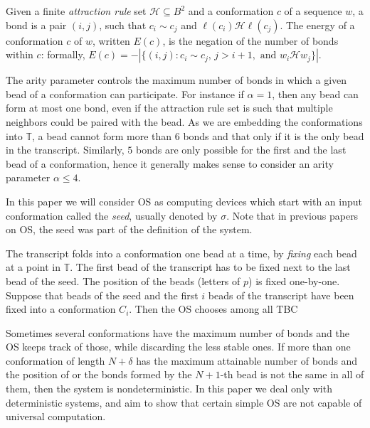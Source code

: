 \documentclass[]{llncs}
\newcommand{\red}{\color{red}}
\newcommand{\black}{\color{black}}
\newcommand{\bond}{\mathcal{H}}
\begin{document}
Given a finite \textit{attraction rule} set $\bond\subseteq B^2$ and a conformation $c$ of a sequence $w$, a bond is a pair $(i,j)$, such that $c_i\sim c_j$ and $\ell(c_i) \bond \ell(c_j)$. The energy of a conformation $c$ of $w$, written $E(c)$, is the negation of the number of bonds within $c$: formally, $E(c) = -|\{(i, j) : c_i \sim c_j \textrm{, } j > i + 1, \textrm{ and } w_i \bond w_j \}|$.

\bigskip



The arity parameter controls the maximum number of bonds in which a given bead of a conformation can participate. For instance if $\alpha=1$, then any bead can form at most one bond, even if the attraction rule set is such that multiple neighbors could be paired with the bead. As we are embedding the conformations into $\mathbb{T}$, a bead cannot form more than $6$ bonds and that only if it is the only bead in the transcript. Similarly, $5$ bonds are only possible for the first and the last bead of a conformation, hence it generally makes sense to consider an arity parameter $\alpha\leq 4$.

In this paper we will consider OS as computing devices which start with an input conformation called the \textit{seed}, usually denoted by $\sigma$. Note that in previous papers on OS, the seed was part of the definition of the system.

The transcript folds into a conformation one bead at a time, by \textit{fixing} each bead at a point in $\mathbb{T}$. The first bead of the transcript has to be fixed next to the last bead of the seed. The position of the beads (letters of $p$) is fixed one-by-one. Suppose that beads of the seed and the first $i$ beads of the transcript have been fixed into a conformation $C_i$. Then the OS chooses among all \red TBC \black


Sometimes several conformations have the maximum number of bonds and the OS keeps track of those, while discarding the less stable ones. If more than one conformation of length $N+\delta$ has the maximum attainable number of bonds and the position of or the bonds formed by the $N+1$-th bead is not the same in all of them, then the system is nondeterministic.
In this paper we deal only with deterministic systems, and aim to show that certain simple OS are not capable of universal computation.

\end{document}
